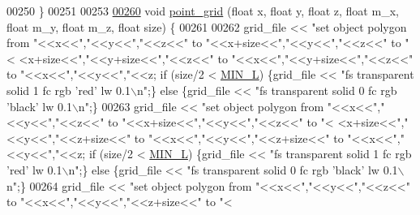 \begin{DoxyCode}
{00250     \}
00251 
00253 
\hypertarget{Logging_8hpp_source.tex_l00260}{}\hyperlink{classLogger_a38c5de03e0de7deffd7b516b13f826ff}{00260}     \textcolor{keywordtype}{void} \hyperlink{classLogger_a38c5de03e0de7deffd7b516b13f826ff}{point\_grid} (\textcolor{keywordtype}{float} x, \textcolor{keywordtype}{float} y, \textcolor{keywordtype}{float} z, \textcolor{keywordtype}{float} m\_x, \textcolor{keywordtype}{float} m\_y, \textcolor{keywordtype}{float} m\_z, \textcolor{keywordtype}{float} size) \{
00261 
00262         grid\_file << \textcolor{stringliteral}{"set object polygon from "}<<x<<\textcolor{stringliteral}{","}<<y<<\textcolor{stringliteral}{","}<<z<<\textcolor{stringliteral}{" to "}<<x+size<<\textcolor{stringliteral}{","}<<y<<\textcolor{stringliteral}{","}<<z<<\textcolor{stringliteral}{" to "}<
      <x+size<<\textcolor{stringliteral}{","}<<y+size<<\textcolor{stringliteral}{","}<<z<<\textcolor{stringliteral}{" to "}<<x<<\textcolor{stringliteral}{","}<<y+size<<\textcolor{stringliteral}{","}<<z<<\textcolor{stringliteral}{" to "}<<x<<\textcolor{stringliteral}{","}<<y<<\textcolor{stringliteral}{","}<<z; \textcolor{keywordflow}{if} (size/2 < 
      \hyperlink{Voxel_8cuh_a29d8f4bb35f9fa62e1d680bc6ab1f4f1}{MIN\_L}) \{grid\_file << \textcolor{stringliteral}{"fs transparent solid 1 fc rgb 'red' lw 0.1\(\backslash\)n"};\} \textcolor{keywordflow}{else} \{grid\_file << \textcolor{stringliteral}{"fs
       transparent solid 0 fc rgb 'black' lw 0.1\(\backslash\)n"};\}
00263         grid\_file << \textcolor{stringliteral}{"set object polygon from "}<<x<<\textcolor{stringliteral}{","}<<y<<\textcolor{stringliteral}{","}<<z<<\textcolor{stringliteral}{" to "}<<x+size<<\textcolor{stringliteral}{","}<<y<<\textcolor{stringliteral}{","}<<z<<\textcolor{stringliteral}{" to "}<
      <x+size<<\textcolor{stringliteral}{","}<<y<<\textcolor{stringliteral}{","}<<z+size<<\textcolor{stringliteral}{" to "}<<x<<\textcolor{stringliteral}{","}<<y<<\textcolor{stringliteral}{","}<<z+size<<\textcolor{stringliteral}{" to "}<<x<<\textcolor{stringliteral}{","}<<y<<\textcolor{stringliteral}{","}<<z; \textcolor{keywordflow}{if} (size/2 < 
      \hyperlink{Voxel_8cuh_a29d8f4bb35f9fa62e1d680bc6ab1f4f1}{MIN\_L}) \{grid\_file << \textcolor{stringliteral}{"fs transparent solid 1 fc rgb 'red' lw 0.1\(\backslash\)n"};\} \textcolor{keywordflow}{else} \{grid\_file << \textcolor{stringliteral}{"fs
       transparent solid 0 fc rgb 'black' lw 0.1\(\backslash\)n"};\}
00264         grid\_file << \textcolor{stringliteral}{"set object polygon from "}<<x<<\textcolor{stringliteral}{","}<<y<<\textcolor{stringliteral}{","}<<z<<\textcolor{stringliteral}{" to "}<<x<<\textcolor{stringliteral}{","}<<y<<\textcolor{stringliteral}{","}<<z+size<<\textcolor{stringliteral}{" to "}<
}
\end{DoxyCode}
